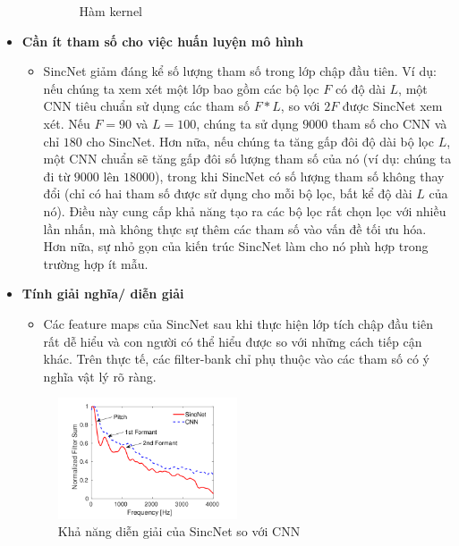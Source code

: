 \documentclass{article}
\begin{document}
\begin{itemize}
\begin{itemize}
\begin{figure}[H]
				\caption{Hàm kernel}
				\label{fig:writing-thesis}
			\end{figure}
		\end{itemize}
		\item \textbf{Cần ít tham số cho việc huấn luyện mô hình}
		\begin{itemize}
			\item SincNet giảm đáng kể số lượng tham số trong lớp chập đầu tiên. Ví dụ: nếu chúng ta xem xét một lớp bao gồm các bộ lọc $F$ có độ dài $L$, một CNN tiêu chuẩn sử dụng các tham số $F * L$, so với $2F$ được SincNet xem xét. Nếu $F = 90$ và $L = 100$, chúng ta sử dụng $9000$ tham số cho CNN và chỉ $180$ cho SincNet. Hơn nữa, nếu chúng ta tăng gấp đôi độ dài bộ lọc $L$, một CNN chuẩn sẽ tăng gấp đôi số lượng tham số của nó (ví dụ: chúng ta đi từ $9000$ lên $18000$), trong khi SincNet có số lượng tham số không thay đổi (chỉ có hai tham số được sử dụng cho mỗi bộ lọc, bất kể độ dài $L$ của nó). Điều này cung cấp khả năng tạo ra các bộ lọc rất chọn lọc với nhiều lần nhấn, mà không thực sự thêm các tham số vào vấn đề tối ưu hóa. Hơn nữa, sự nhỏ gọn của kiến trúc SincNet làm cho nó phù hợp trong trường hợp ít mẫu.
		\end{itemize}
		\item \textbf{Tính giải nghĩa/ diễn giải}
		\begin{itemize}
			\item Các feature maps của SincNet sau khi thực hiện lớp tích chập đầu tiên rất dễ hiểu và con người có thể hiểu được so với những cách tiếp cận khác. Trên thực tế, các filter-bank chỉ phụ thuộc vào các tham số có ý nghĩa vật lý rõ ràng.
		\end{itemize}
		\begin{figure}[H]
			\centering
			\includegraphics[width=0.5\textwidth]{images/interpretability.png}
			\caption{Khả năng diễn giải của SincNet so với CNN}
			\label{fig:writing-thesis}
		\end{figure}
	

\end{itemize}
\end{document}
